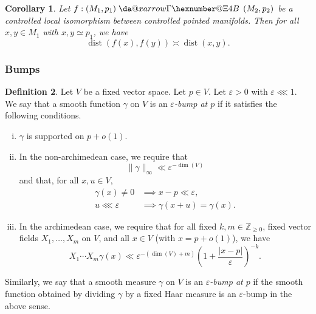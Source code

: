 \documentclass[reqno]{amsart}
\makeatletter
\newcommand*{\da@rightarrow}{\mathchar"0\hexnumber@\symAMSa 4B }
\newcommand*{\xdashrightarrow}[2][]{%
  \mathrel{%
    \mathpalette{\da@xarrow{#1}{#2}{}\da@rightarrow{\,}{}}{}%
  }%
}
\newcommand*{\da@xarrow}[7]{%
  \sbox0{$\ifx#7\scriptstyle\scriptscriptstyle\else\scriptstyle\fi#5#1#6\m@th$}%
  \sbox2{$\ifx#7\scriptstyle\scriptscriptstyle\else\scriptstyle\fi#5#2#6\m@th$}%
  \sbox4{$#7\dabar@\m@th$}%
  \dimen@=\wd0 %
  \ifdim\wd2 >\dimen@
    \dimen@=\wd2 %
  \fi
  \count@=2 %
  \def\da@bars{\dabar@\dabar@}%
  \@whiledim\count@\wd4<\dimen@\do{%
    \advance\count@\@ne
    \expandafter\def\expandafter\da@bars\expandafter{%
      \da@bars
      \dabar@ 
    }%
  }%
  \mathrel{#3}%
  \mathrel{%
    \mathop{\da@bars}\limits
    \ifx\\#1\\%
    \else
      _{\copy0}%
    \fi
    \ifx\\#2\\%
    \else
      ^{\copy2}%
    \fi
  }%
  \mathrel{#4}%
}
\def\eps{\varepsilon}
\DeclareMathOperator{\dist}{dist}
\theoremstyle{plain} \newtheorem{theorem} {Theorem}
\newtheorem{corollary} [theorem] {Corollary}
\theoremstyle{definition} \newtheorem{definition} [theorem] {Definition}
\theoremstyle{itplain} %
\numberwithin{equation}{section}
\numberwithin{theorem}{section}
\renewcommand{\geq}{\geqslant}
\makeatother
\begin{document}
\begin{corollary}\label{lem:standard:let-phi-controlled-dist-preserve}
  Let $f : (M_1, p_1) \xdashrightarrow{} (M_2, p_2)$ be a controlled local isomorphism between controlled pointed manifolds.  Then for all $x,y \in M_1$ with $x,y \simeq p_1$, we have
  \begin{equation*}
    \dist(f(x), f(y)) \asymp \dist(x,y).
  \end{equation*}
\end{corollary}



\subsubsection{Bumps}

\begin{definition}
Let $V$ be a fixed vector space.  Let $p \in V$.  Let $\eps > 0$ with $\eps \lll 1$.  We say that a smooth function $\gamma$ on $V$ is an \emph{$\eps$-bump at $p$} if it satisfies the following conditions.
\begin{enumerate}[(i)]
\item $\gamma$ is supported on $p + o(1)$.
\item In the non-archimedean case, we require that
  \begin{equation*}
    \|\gamma\|_\infty \ll \eps^{-\dim(V)}
  \end{equation*}
  and that, for all $x, u \in V$,
  \begin{align*}
    \gamma(x) \neq 0 &\implies x - p \ll  \eps, \\
    u \lll \eps &\implies \gamma(x+u) = \gamma(x).
  \end{align*}
\item \label{item:epsilon-bump-3} In the archimedean case, we require that for all fixed $k,m \in \mathbb{Z}_{\geq 0}$, fixed vector fields $X_1,\dotsc,X_m$ on $V$, and all $x \in V$ (with $x = p + o(1)$), we have
  \begin{equation}\label{eq:y_1-dotsb-y_m}
    X_1 \dotsb X_m \gamma(x)
    \ll \eps^{-(\dim(V) + m)} \left( 1 + \frac{|x-p|}{\eps} \right)^{-k}.
  \end{equation}
\end{enumerate}
Similarly, we say that a smooth measure $\gamma$ on $V$ is an \emph{$\eps$-bump at $p$} if the smooth function obtained by dividing $\gamma$ by a fixed Haar measure is an $\eps$-bump in the above sense.
\end{definition}
\end{document}
